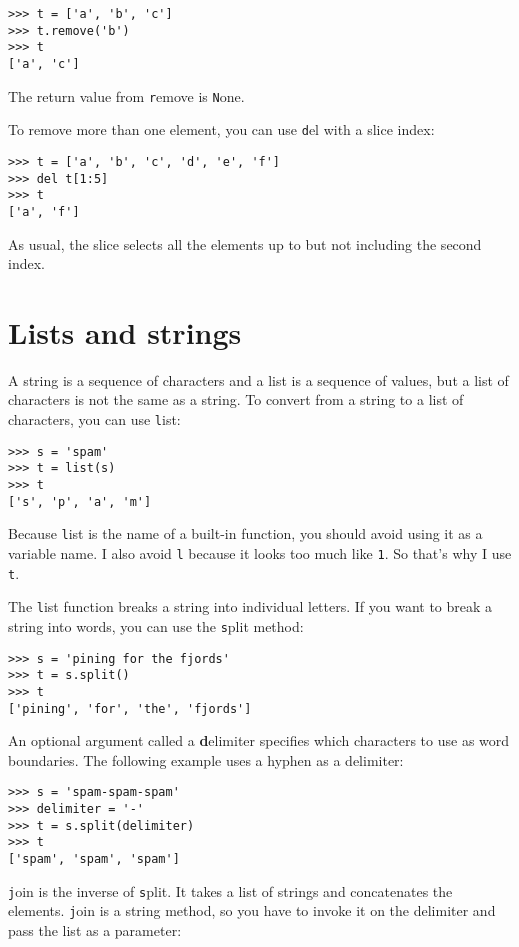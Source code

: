 \documentclass[
DIV=11,
fontsize=13,
twoside,
headinclude=false,
titlepage=firstiscover,
abstract=true,
headsepline=true,
footsepline=true,
chapterprefix=true, %
headings=big,
bibliography=totoc,%
captions=tableheading
]{scrbook}
\theoremstyle{definition}
\begin{document}
\begin{lstlisting}
>>> t = ['a', 'b', 'c']
>>> t.remove('b')
>>> t
['a', 'c']
\end{lstlisting}
%
The return value from {\texttt remove} is {\texttt None}.

To remove more than one element, you can use {\texttt del} with
a slice index:

\begin{lstlisting}
>>> t = ['a', 'b', 'c', 'd', 'e', 'f']
>>> del t[1:5]
>>> t
['a', 'f']
\end{lstlisting}
%
As usual, the slice selects all the elements up to but not
including the second index.



\section{Lists and strings}

A string is a sequence of characters and a list is a sequence
of values, but a list of characters is not the same as a
string.  To convert from a string to a list of characters,
you can use {\texttt list}:

\begin{lstlisting}
>>> s = 'spam'
>>> t = list(s)
>>> t
['s', 'p', 'a', 'm']
\end{lstlisting}
%
Because {\texttt list} is the name of a built-in function, you should
avoid using it as a variable name.  I also avoid {\texttt l} because
it looks too much like {\texttt 1}.  So that's why I use {\texttt t}.

The {\texttt list} function breaks a string into individual letters.  If
you want to break a string into words, you can use the {\texttt split}
method:

\begin{lstlisting}
>>> s = 'pining for the fjords'
>>> t = s.split()
>>> t
['pining', 'for', 'the', 'fjords']
\end{lstlisting}
%
An optional argument called a {\textbf delimiter} specifies which
characters to use as word boundaries.
The following example
uses a hyphen as a delimiter:

\begin{lstlisting}
>>> s = 'spam-spam-spam'
>>> delimiter = '-'
>>> t = s.split(delimiter)
>>> t
['spam', 'spam', 'spam']
\end{lstlisting}
%
{\texttt join} is the inverse of {\texttt split}.  It
takes a list of strings and
concatenates the elements.  {\texttt join} is a string method,
so you have to invoke it on the delimiter and pass the
list as a parameter:
\end{document}
